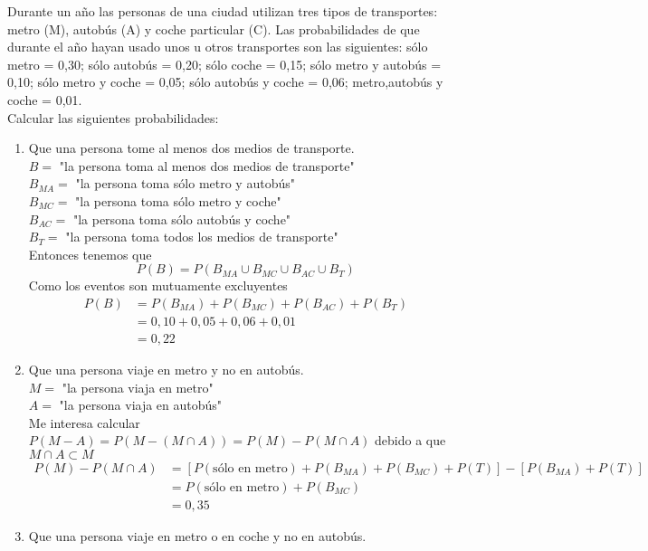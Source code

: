\item Durante  un año las personas de una ciudad utilizan tres tipos de transportes: metro (M), autobús (A) y coche particular (C). Las probabilidades de que durante el año hayan usado unos u otros transportes son las siguientes: sólo metro = 0,30; sólo autobús = 0,20; sólo coche = 0,15; sólo metro y autobús = 0,10; sólo metro y coche = 0,05; sólo autobús y coche = 0,06; metro,autobús y coche = 0,01.\\
    Calcular las siguientes probabilidades:
    \begin{enumerate}
        \item Que una persona tome al menos dos medios de transporte.\e\\
            $B=$ "la persona toma al menos dos medios de transporte"\\
            $B_{MA}=$ "la persona toma sólo metro y autobús"\\
            $B_{MC}=$ "la persona toma sólo metro y coche"\\
            $B_{AC}=$ "la persona toma sólo autobús y coche"\\
            $B_{T}=$ "la persona toma todos los medios de transporte"\\
            Entonces tenemos que\[P(B)=P(B_{MA}\cup B_{MC}\cup B_{AC}\cup B_{T})\]
            Como los eventos son mutuamente excluyentes\begin{align*}
                P(B)&=P(B_{MA})+P(B_{MC})+P(B_{AC})+P(B_{T})\\
                &=0,10+0,05+0,06+0,01\\
                &=0,22
            \end{align*}
        \item Que una persona viaje en metro y no en autobús.\e\\
            $M=$ "la persona viaja en metro"\\
            $A=$ "la persona viaja en autobús"\\
            Me interesa calcular $P(M-A)=P(M-(M\cap A))=P(M)-P(M\cap A)$ debido a que $M\cap A \subset M$
            \begin{align*}
                P(M)-P(M\cap A)&=[P(\text{sólo en metro})+P(B_{MA})+P(B_{MC})+P(T)]-[P(B_{MA})+P(T)]\\
                &=P(\text{sólo en metro})+P(B_{MC})\\
                &=0,35
            \end{align*}
        \item Que una persona viaje en metro o en coche y no en autobús.\e\\

\end{enumerate}
